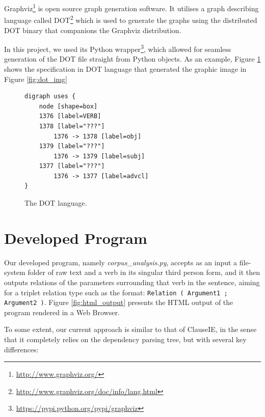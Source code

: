 \documentclass[11pt,a4paper,openright]{memoir}
\begin{document}
Graphviz\footnote{\url{http://www.graphviz.org/}} is open source graph generation software. It utilises a graph describing language called DOT\footnote{\url{http://www.graphviz.org/doc/info/lang.html}} which is used to generate the graphs using the distributed DOT binary that companions the Graphviz distribution.

In this project, we used its Python wrapper\footnote{\url{https://pypi.python.org/pypi/graphviz}}, which allowed for seamless generation of the DOT file straight from Python objects. As an example, Figure \ref{fig:dot_lang} shows the specification in DOT language that generated the graphic image in Figure \ref{fig:dot_img}

\begin{figure}[!htbp]

\begin{verbatim}
digraph uses {
    node [shape=box]
    1376 [label=VERB]
    1378 [label="???"]
        1376 -> 1378 [label=obj]
    1379 [label="???"]
        1376 -> 1379 [label=subj]
    1377 [label="???"]
        1376 -> 1377 [label=advcl]
}
\end{verbatim}

  \caption[The DOT language.]{The DOT language.}
  \label{fig:dot_lang}
\end{figure}


%
%
%

\section{Developed Program}

Our developed program, namely \emph{corpus\_analysis.py}, accepts as an input a file-system folder of raw text and a verb in its singular third person form, and it then outputs relations of the parameters surrounding that verb in the sentence, aiming for a triplet relation type such as the format: \texttt{Relation ( Argument1 ; Argument2 )}. Figure \ref{fig:html_output} presents the HTML output of the program rendered in a Web Browser.

To some extent, our current approach is similar to that of ClauseIE, in the sense that it completely relies on the dependency parsing tree, but with several key differences:
\end{document}

